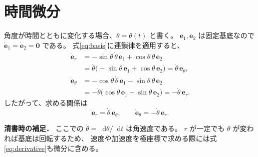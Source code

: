 \documentclass[a4paper,11pt]{ltjsarticle}
\newcommand{\ve}[1]{\boldsymbol{#1}}
\newcommand{\dd}{\mathop{}\!\mathrm{d}}
\begin{document}
\section{時間微分}

角度が時間とともに変化する場合、$\theta=\theta(t)$ と書く。
$\ve e_1,\ve e_2$ は固定基底なので
$\dot{\ve e}_1=\dot{\ve e}_2=\ve 0$ である。
式\eqref{eq:basis}に連鎖律を適用すると、
\begin{align*}
\dot{\ve e}_r
 &= -\sin\theta\,\dot\theta\,\ve e_1
    +\cos\theta\,\dot\theta\,\ve e_2 \\
 &= \dot\theta\bigl(-\sin\theta\,\ve e_1
    +\cos\theta\,\ve e_2\bigr)
  =\boxed{\dot\theta\,\ve e_\theta},\\[4pt]
\dot{\ve e}_\theta
 &= -\cos\theta\,\dot\theta\,\ve e_1
    -\sin\theta\,\dot\theta\,\ve e_2 \\
 &= -\dot\theta\bigl(\cos\theta\,\ve e_1
    +\sin\theta\,\ve e_2\bigr)
  =\boxed{-\dot\theta\,\ve e_r}.
\end{align*}
したがって、求める関係は
\begin{equation}\label{eq:derivative}
\boxed{\dot{\ve e}_r=\dot\theta\,\ve e_\theta,
\qquad
\dot{\ve e}_\theta=-\dot\theta\,\ve e_r.}
\end{equation}

\noindent\textbf{清書時の補足．}
ここでの $\dot\theta=\dd\theta/\dd t$ は角速度である。
$r$ が一定でも $\theta$ が変われば基底は回転するため、
速度や加速度を極座標で求める際には式\eqref{eq:derivative}も微分に含める。
\end{document}
